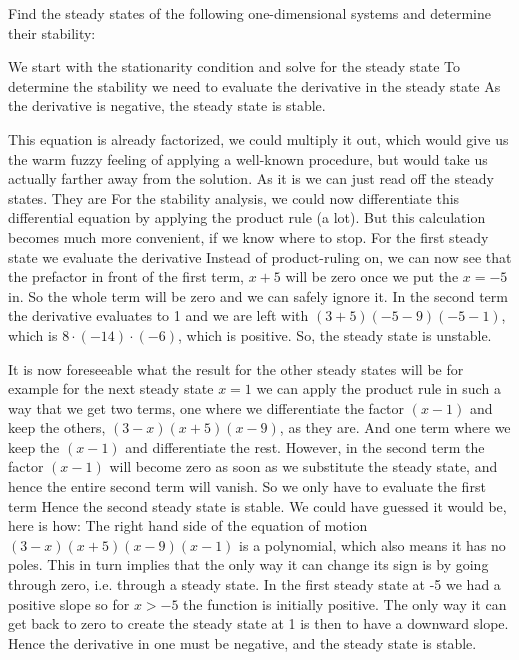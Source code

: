 
Find the steady states of the following one-dimensional systems and determine their stability:
\subquestion
{}

\solution
We start with the stationarity condition 
and solve for the steady state 
To determine the stability we need to evaluate the derivative in the steady state
As the derivative is negative, the steady state is stable. 

\subquestion
{}

\solution
This equation is already factorized, we could multiply it out, which would give us the warm fuzzy feeling of applying a well-known procedure, but would take us actually farther away from the solution. As it is we can just read off the steady states. They are 
For the stability analysis, we could now differentiate this differential equation by applying the product rule (a lot). But this calculation becomes much more convenient, if we know where to stop. For the first steady state we evaluate the derivative 
Instead of product-ruling on, we can now see that the prefactor in front of the first term, $x+5$ will be zero once we put the $x=-5$ in. So the whole term will be zero and we can safely ignore it. In the second term the derivative evaluates to 1 and we are left with $(3+5)(-5-9)(-5-1)$, which is $8\cdot (-14) \cdot (-6)$, which is positive. So, the steady state is unstable.

It is now foreseeable what the result for the other steady states will be for example for the next steady state $x=1$ we can apply the product rule in such a way that we get two terms, one where we differentiate the factor $(x-1)$ and keep the others, $(3-x)(x+5)(x-9)$, as they are. And one term where we keep the $(x-1)$ and differentiate the rest. However, in the second term the factor $(x-1)$ will become zero as soon as we substitute the steady state, and hence the entire second term will vanish. So we only have to evaluate the first term 
Hence the second steady state is stable. We could have guessed it would be, here is how: The right hand side of the equation of motion $(3-x)(x+5)(x-9)(x-1)$ is a polynomial, which also means it has no poles. This in turn implies that the only way it can change its sign is by going through zero, i.e. through a steady state. In the first steady state at -5 we had a positive slope so for $x>-5$ the function is initially positive. The only way it can get back to zero to create the steady state at 1 is then to have a downward slope. Hence the derivative in one must be negative, and the steady state is stable. 


